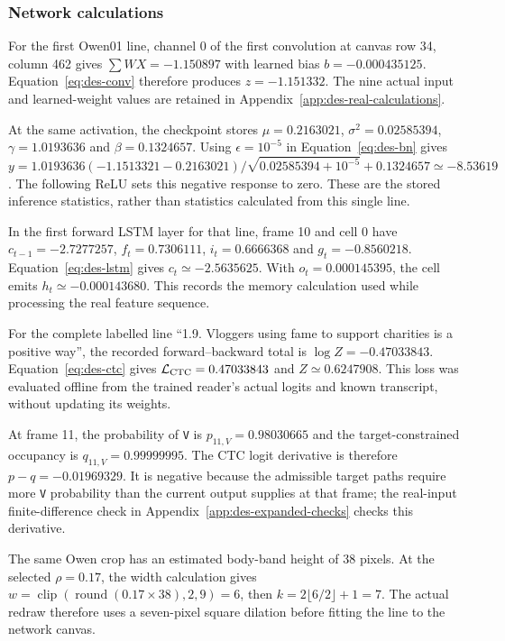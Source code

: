 \subsubsection{Network calculations}
For the first Owen01 line, channel 0 of the first convolution at canvas row 34, column 462 gives $\sum WX=-1.150897$ with learned bias $b=-0.000435125$. Equation~\ref{eq:des-conv} therefore produces $z=-1.151332$. The nine actual input and learned-weight values are retained in Appendix~\ref{app:des-real-calculations}.

At the same activation, the checkpoint stores $\mu=0.2163021$, $\sigma^2=0.02585394$, $\gamma=1.0193636$ and $\beta=0.1324657$. Using $\epsilon=10^{-5}$ in Equation~\ref{eq:des-bn} gives $y=1.0193636(-1.1513321-0.2163021)/\sqrt{0.02585394+10^{-5}}+0.1324657\simeq-8.53619$. The following ReLU sets this negative response to zero. These are the stored inference statistics, rather than statistics calculated from this single line.

In the first forward LSTM layer for that line, frame 10 and cell 0 have $c_{t-1}=-2.7277257$, $f_t=0.7306111$, $i_t=0.6666368$ and $g_t=-0.8560218$. Equation~\ref{eq:des-lstm} gives $c_t\simeq-2.5635625$. With $o_t=0.000145395$, the cell emits $h_t\simeq-0.000143680$. This records the memory calculation used while processing the real feature sequence.

For the complete labelled line ``1.9. Vloggers using fame to support charities is a positive way'', the recorded forward--backward total is $\log Z=-0.47033843$. Equation~\ref{eq:des-ctc} gives $\mathcal L_{\rm CTC}=0.47033843$ and $Z\simeq0.6247908$. This loss was evaluated offline from the trained reader's actual logits and known transcript, without updating its weights.

At frame 11, the probability of \texttt{V} is $p_{11,V}=0.98030665$ and the target-constrained occupancy is $q_{11,V}=0.99999995$. The CTC logit derivative is therefore $p-q=-0.01969329$. It is negative because the admissible target paths require more \texttt{V} probability than the current output supplies at that frame; the real-input finite-difference check in Appendix~\ref{app:des-expanded-checks} checks this derivative.

The same Owen crop has an estimated body-band height of 38 pixels. At the selected $\rho=0.17$, the width calculation gives $w=\operatorname{clip}(\operatorname{round}(0.17\times38),2,9)=6$, then $k=2\lfloor6/2\rfloor+1=7$. The actual redraw therefore uses a seven-pixel square dilation before fitting the line to the network canvas.


